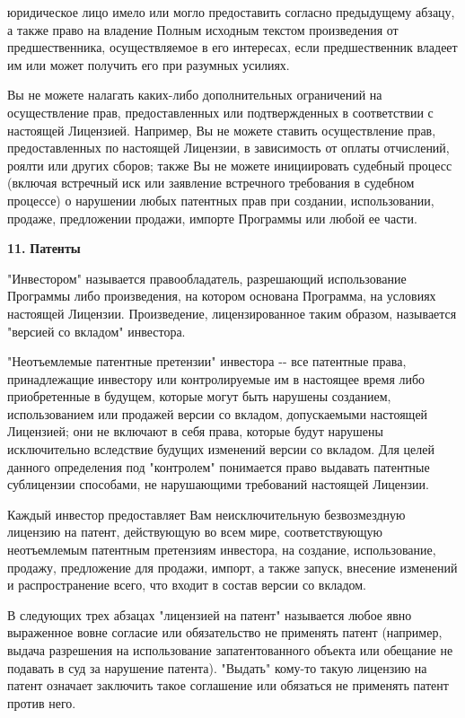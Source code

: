 юридическое лицо имело или могло предоставить согласно предыдущему абзацу, а также право на владение Полным исходным текстом произведения от предшественника, осуществляемое в его интересах, если предшественник владеет им или может получить его при разумных усилиях.

Вы не можете налагать каких-\/либо дополнительных ограничений на осуществление прав, предоставленных или подтвержденных в соответствии с настоящей Лицензией. Например, Вы не можете ставить осуществление прав, предоставленных по настоящей Лицензии, в зависимость от оплаты отчислений, роялти или других сборов; также Вы не можете инициировать судебный процесс (включая встречный иск или заявление встречного требования в судебном процессе) о нарушении любых патентных прав при создании, использовании, продаже, предложении продажи, импорте Программы или любой ее части.

{\bfseries{11.}} {\bfseries{Патенты}}

"{}Инвестором"{} называется правообладатель, разрешающий использование Программы либо произведения, на котором основана Программа, на условиях настоящей Лицензии. Произведение, лицензированное таким образом, называется "{}версией со вкладом"{} инвестора.

"{}Неотъемлемые патентные претензии"{} инвестора -\/-\/ все патентные права, принадлежащие инвестору или контролируемые им в настоящее время либо приобретенные в будущем, которые могут быть нарушены созданием, использованием или продажей версии со вкладом, допускаемыми настоящей Лицензией; они не включают в себя права, которые будут нарушены исключительно вследствие будущих изменений версии со вкладом. Для целей данного определения под "{}контролем"{} понимается право выдавать патентные сублицензии способами, не нарушающими требований настоящей Лицензии.

Каждый инвестор предоставляет Вам неисключительную безвозмездную лицензию на патент, действующую во всем мире, соответствующую неотъемлемым патентным претензиям инвестора, на создание, использование, продажу, предложение для продажи, импорт, а также запуск, внесение изменений и распространение всего, что входит в состав версии со вкладом.

В следующих трех абзацах "{}лицензией на патент"{} называется любое явно выраженное вовне согласие или обязательство не применять патент (например, выдача разрешения на использование запатентованного объекта или обещание не подавать в суд за нарушение патента). "{}Выдать"{} кому-\/то такую лицензию на патент означает заключить такое соглашение или обязаться не применять патент против него.

